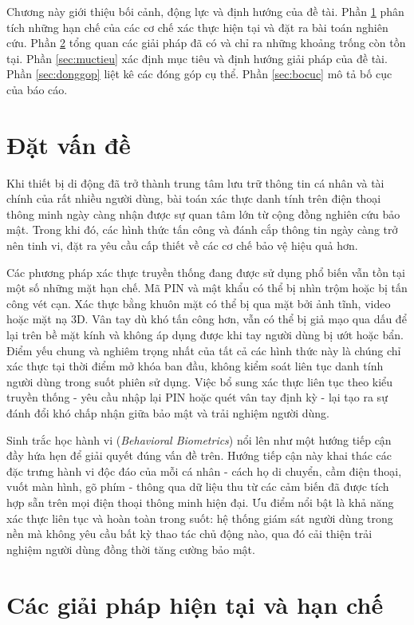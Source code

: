 \documentclass[../DoAn.tex]{subfiles}
\begin{document}
Chương này giới thiệu bối cảnh, động lực và định hướng của đề tài. Phần \ref{sec:dvd} phân tích những hạn chế của các cơ chế xác thực hiện tại và đặt ra bài toán nghiên cứu. Phần \ref{sec:hientrang} tổng quan các giải pháp đã có và chỉ ra những khoảng trống còn tồn tại. Phần \ref{sec:muctieu} xác định mục tiêu và định hướng giải pháp của đề tài. Phần \ref{sec:donggop} liệt kê các đóng góp cụ thể. Phần \ref{sec:bocuc} mô tả bố cục của báo cáo.

\section{Đặt vấn đề}
\label{sec:dvd}

Khi thiết bị di động đã trở thành trung tâm lưu trữ thông tin cá nhân và tài chính của rất nhiều người dùng, bài toán xác thực danh tính trên điện thoại thông minh ngày càng nhận được sự quan tâm lớn từ cộng đồng nghiên cứu bảo mật. Trong khi đó, các hình thức tấn công và đánh cắp thông tin ngày càng trở nên tinh vi, đặt ra yêu cầu cấp thiết về các cơ chế bảo vệ hiệu quả hơn.

Các phương pháp xác thực truyền thống đang được sử dụng phổ biến vẫn tồn tại một số những mặt hạn chế. Mã PIN và mật khẩu có thể bị nhìn trộm hoặc bị tấn công vét cạn. Xác thực bằng khuôn mặt có thể bị qua mặt bởi ảnh tĩnh, video hoặc mặt nạ 3D. Vân tay dù khó tấn công hơn, vẫn có thể bị giả mạo qua dấu để lại trên bề mặt kính và không áp dụng được khi tay người dùng bị ướt hoặc bẩn. Điểm yếu chung và nghiêm trọng nhất của tất cả các hình thức này là chúng chỉ xác thực tại thời điểm mở khóa ban đầu, không kiểm soát liên tục danh tính người dùng trong suốt phiên sử dụng. Việc bổ sung xác thực liên tục theo kiểu truyền thống - yêu cầu nhập lại PIN hoặc quét vân tay định kỳ - lại tạo ra sự đánh đổi khó chấp nhận giữa bảo mật và trải nghiệm người dùng.

Sinh trắc học hành vi (\textit{Behavioral Biometrics}) nổi lên như một hướng tiếp cận đầy hứa hẹn để giải quyết đúng vấn đề trên. Hướng tiếp cận này khai thác các đặc trưng hành vi độc đáo của mỗi cá nhân - cách họ di chuyển, cầm điện thoại, vuốt màn hình, gõ phím - thông qua dữ liệu thu từ các cảm biến đã được tích hợp sẵn trên mọi điện thoại thông minh hiện đại. Ưu điểm nổi bật là khả năng xác thực liên tục và hoàn toàn trong suốt: hệ thống giám sát người dùng trong nền mà không yêu cầu bất kỳ thao tác chủ động nào, qua đó cải thiện trải nghiệm người dùng đồng thời tăng cường bảo mật.

\section{Các giải pháp hiện tại và hạn chế}
\label{sec:hientrang}
\end{document}

